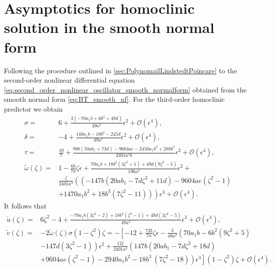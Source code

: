 \section{Asymptotics for homoclinic solution in the smooth normal form}
\label{sec:asymptotics-for-homoclinic-solution-for-the-smooth-normal-form}

Following the procedure outlined in \cref{sec:PolynomailLindstedtPoincare} to
the second-order nonlinear differential equation
\cref{eq:second_order_nonlinear_oscillator_smooth_normalform} obtained from the
smooth normal form \cref{eq:BT_smooth_nf}. For the third-order homoclinic
predictor we obtain
\begin{align}
				\sigma ={}& 6 + \frac{3 \left(-70 a_1 b+6 b^2+49 d\right)}{49 a^2} \epsilon^2
                    + \mathcal{O}(\epsilon^4),
				\nonumber \\
				\delta ={}& -4 + \frac{140 a_1 b-18 b^2-245 d}{49 a^2} \epsilon^2
                    + \mathcal{O}(\epsilon^4),
				\nonumber \\
				\label{eq:tau_smooth}
				\tau   ={}& \frac{10}{7} + \frac{98 b (50 a b_1+73 d)-9604 a e-2450 a_1 b^2+288 b^3}{2401 a^2 b} \epsilon^2
								+ \mathcal{O}(\epsilon^4), \\
				\tilde \omega(\zeta) ={}& 1 - \frac{6b}{7a}\zeta  \epsilon	+ 
				\frac{70 a_1 b+18 b^2 \left(3 \zeta ^2+1\right)+49 d \left(9 \zeta ^2-5\right)}{196 a^2} \epsilon^2 +
				\nonumber \\
        & \frac{\zeta}{2401 a^3} \left( \left(-147 b \left(20 a b_1-7 d
        \zeta ^2+11 d\right)-9604 a e \left(\zeta ^2-1\right) \right. \right. \nonumber \\
        & \left. \left. +1470 a_1 b^2+18 b^3 \left(7 \zeta ^2-11\right)\right) \right)\epsilon^3 + \mathcal{O}(\epsilon^4)
        \nonumber.
\end{align}
It follows that
\begin{align}
    \label{eq:third_order_uhat_smooth}
    \tilde {u}(\zeta) 
    ={}& 6 \zeta ^2-4 + \frac{-70 a_1 b \left(3 \zeta ^2-2\right)+18 b^2 \left(\zeta
    ^2-1\right)+49 d \left(3 \zeta ^2-5\right)}{49 a^2} \epsilon^2 
        + \mathcal{O}(\epsilon^4), \\
    \label{eq:third_order_vhat_smooth}
	\tilde  v(\zeta) 
  ={}& -2 \tilde\omega(\zeta) \sigma (1-\zeta^2)\zeta
	= -\left[ -12 + \frac{72b}{7a} \zeta \epsilon
			 - \frac{3}{49 a^2} \left(70 a_1 b-6 b^2 \left(9 \zeta ^2+5\right)
       \right. \right. \\
     & \left. -147 d \left(3 \zeta ^2-1\right)\right)\epsilon^2 + \frac{12
         \zeta}{2401 a^3}  \left(147 b \left(20 a b_1-7 d \zeta ^2+18
         d\right) \right. \nonumber \\
    & \left. \left. + 9604 a e \left(\zeta ^2-1\right)-2940 a_1 b^2-18 b^3 \
\left(7 \zeta ^2-18\right)\right) \epsilon^3 \right]
     (1-\zeta^2) \zeta + \mathcal{O}(\epsilon^4) \nonumber.
\end{align}

